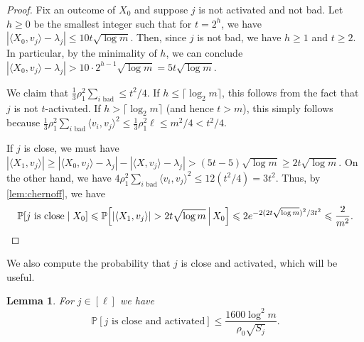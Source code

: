 \documentclass[reqno]{amsart}
\newtheorem{lemma}[theorem]{Lemma}
\theoremstyle{remark}
\theoremstyle{definition}
\numberwithin{theorem}{section}
\renewcommand{\(}{\bigl(}
\renewcommand{\)}{\bigr)\vphantom{)}}
\renewcommand{\le}{\leqslant}
\renewcommand{\ge}{\geqslant}
\renewcommand{\P}{\mathbb{P}}
\newcommand{\ceil}[1]{\lceil#1\rceil}
\newcommand{\ang}[1]{\langle#1\rangle}
\begin{document}
\begin{proof} 
Fix an outcome of $X_0$ and suppose $j$ is not activated and not bad. Let $h\ge 0$ be the smallest integer such that for $t = 2^h$, we have $|\ang{X_0, v_j} - \lambda_j| \le 10t\sqrt{\log m}$. Then, since $j$ is not bad, we have $h\ge 1$ and $t\ge 2$. In particular, by the minimality of $h$, we can conclude $|\ang{X_0, v_j} - \lambda_j| > 10\cdot 2^{h-1}\sqrt{\log m}=5t\sqrt{\log m}$.

We claim that $\frac{1}{3}\rho_1^2\sum_{i\text{ bad}}\le t^2/4$. If $h\le \ceil{\log_2 m}$, this follows from the fact that $j$ is not $t$-activated. If $h>\ceil{\log_2 m}$ (and hence $t>m$), this simply follows because $\frac{1}{3}\rho_1^2\sum_{i \text{ bad}}\ang{v_i, v_j}^2 \le \frac{1}{3}\rho_1^2 \ell \le m^2/4<t^2/4$.

If $j$ is close, we must have $|\ang{X_1, v_j}| \ge |\ang{X_0, v_j} - \lambda_j|-|\ang{X, v_j} - \lambda_j|> (5t-5)\sqrt{\log m}\ge 2t\sqrt{\log m}$. On the other hand, we have $4\rho_1^2\sum_{i\text{ bad}}\ang{v_i,v_j}^2 \le 12(t^2/4) = 3t^2$. Thus, by \cref{lem:chernoff}, we have
\[
 \P[j\text{ is close} \mid X_0] 
\le \P\Big[|\ang{X_1, v_j}| > 2t\sqrt{\log m} \,\Big|\, X_0\Big]
\le 2e^{-2(2t\sqrt{\log m})^2/3t^2}\le \frac{2}{m^{2}}.\qedhere
\]

\end{proof}


We also compute the probability that $j$ is close and activated, which will be useful. 

\begin{lemma}\label{lem:prob-activated-in-F}
    For $j\in [\ell]$ we have 
    \[\P[j\text{ is close and activated}]\le \frac{1600\log^2 m}{\rho_0\sqrt{S_j}}.\]
\end{lemma}
\end{document}

